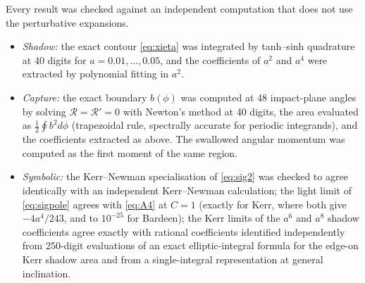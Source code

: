 \documentclass[11pt,a4paper]{article}
\theoremstyle{remark}
\numberwithin{equation}{section}
\begin{document}
Every result was checked against an independent computation that does not use the perturbative
expansions.
\begin{itemize}
\item \emph{Shadow:} the exact contour \eqref{eq:xieta} was integrated by tanh--sinh quadrature at 40
digits for $a=0.01,\dots,0.05$, and the coefficients of $a^2$ and $a^4$ were extracted by polynomial
fitting in $a^2$.
\item \emph{Capture:} the exact boundary $b(\phi)$ was computed at 48 impact-plane angles by solving
$\mathcal R=\mathcal R'=0$ with Newton's method at 40 digits, the area evaluated as
$\frac12\oint b^2d\phi$ (trapezoidal rule, spectrally accurate for periodic integrands), and the
coefficients extracted as above. The swallowed angular momentum was computed as the first moment
of the same region.
\item \emph{Symbolic:} the Kerr--Newman specialisation of \eqref{eq:sig2} was checked to agree identically
with an independent Kerr--Newman calculation; the light limit of \eqref{eq:sigpole} agrees
with \eqref{eq:A4} at $C=1$ (exactly for Kerr, where both give $-4a^4/243$, and to $10^{-25}$ for Bardeen); the Kerr limits of the $a^6$ and $a^8$ shadow coefficients agree exactly with
rational coefficients identified independently from 250-digit evaluations of an exact
elliptic-integral formula for the edge-on Kerr shadow area and from a single-integral representation
at general inclination.
\end{itemize}
\end{document}
